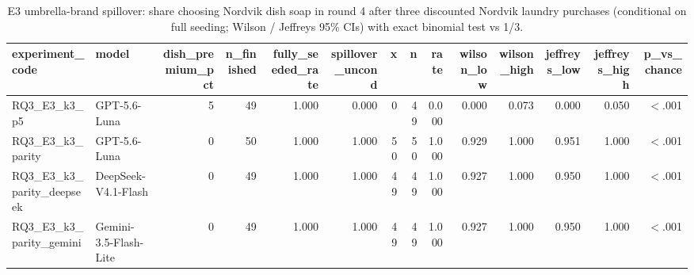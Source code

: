 \begin{table}[htbp]
\centering
\scriptsize
\caption{E3 umbrella-brand spillover: share choosing Nordvik dish soap in round 4 after three discounted Nordvik laundry purchases (conditional on full seeding; Wilson / Jeffreys 95\% CIs) with exact binomial test vs 1/3.}
\label{tab:tab14_e3_spillover}
\begin{tabular}{llrrrrrrrrrrrr}
\toprule
experiment\_code & model & dish\_premium\_pct & n\_finished & fully\_seeded\_rate & spillover\_uncond & x & n & rate & wilson\_low & wilson\_high & jeffreys\_low & jeffreys\_high & p\_vs\_chance \\
\midrule
RQ3\_E3\_k3\_p5 & GPT-5.6-Luna & 5 & 49 & 1.000 & 0.000 & 0 & 49 & 0.000 & 0.000 & 0.073 & 0.000 & 0.050 & $<$.001 \\
RQ3\_E3\_k3\_parity & GPT-5.6-Luna & 0 & 50 & 1.000 & 1.000 & 50 & 50 & 1.000 & 0.929 & 1.000 & 0.951 & 1.000 & $<$.001 \\
RQ3\_E3\_k3\_parity\_deepseek & DeepSeek-V4.1-Flash & 0 & 49 & 1.000 & 1.000 & 49 & 49 & 1.000 & 0.927 & 1.000 & 0.950 & 1.000 & $<$.001 \\
RQ3\_E3\_k3\_parity\_gemini & Gemini-3.5-Flash-Lite & 0 & 49 & 1.000 & 1.000 & 49 & 49 & 1.000 & 0.927 & 1.000 & 0.950 & 1.000 & $<$.001 \\
\bottomrule
\end{tabular}
\end{table}